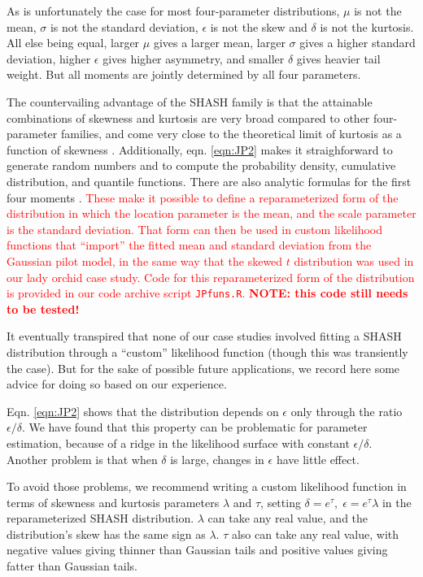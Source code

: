 \documentclass[12pt]{article}
\newcommand{\new}{\textcolor{red}}
\begin{document}
As is unfortunately the case for most four-parameter distributions, $\mu$ is not the mean, $\sigma$ is not the standard deviation, $\epsilon$ is not
the skew and $\delta$ is not the kurtosis. All else being equal, larger $\mu$ gives a larger mean, larger $\sigma$ gives a higher
standard deviation, higher $\epsilon$ gives higher asymmetry, and smaller $\delta$ gives heavier tail weight. 
But all moments are jointly determined by all four parameters. 

The countervailing advantage of the SHASH family is that the attainable combinations of skewness and kurtosis are very broad compared to other 
four-parameter families, and come very close to the theoretical limit of kurtosis as a function of skewness \citep[][Fig.  2]{jones-pewsey-2009}. 
Additionally, eqn. \eqref{eqn:JP2} makes it straighforward to generate random numbers and to compute 
the probability density, cumulative distribution, and quantile functions. There are also analytic formulas for the first four moments
\citep[][p. 764]{jones-pewsey-2009}. \new{These make it possible to define a reparameterized form of the distribution in which the
location parameter is the mean, and the scale parameter is the standard deviation. That form can then be used in
custom likelihood functions that ``import'' the fitted mean and standard deviation from the Gaussian pilot model, 
in the same way that the skewed $t$ distribution was used in our lady orchid case study. 
Code for this reparameterized form of the distribution is provided in our code archive script \texttt{JPfuns.R}. \textbf{NOTE: this code still needs to be tested!}}  

It eventually transpired that none of our case studies involved fitting a SHASH distribution through a ``custom'' likelihood 
function (though this was transiently the case). But for the sake of possible future applications, we record here some 
advice for doing so based on our experience. 

Eqn. \eqref{eqn:JP2} shows that the distribution depends on $\epsilon$ only through the ratio $\epsilon/\delta$. We have found
that this property can be problematic for parameter estimation, because of a ridge in the likelihood surface with constant  
$\epsilon/\delta$. Another problem is that when $\delta$ is large, changes in $\epsilon$ have little effect. 

To avoid those problems, we recommend writing a custom likelihood function in terms of 
skewness and kurtosis parameters $\lambda$ and $\tau$, setting $\delta = e^{\tau}, \; \epsilon =  e^{\tau} \lambda$ in the 
reparameterized SHASH distribution. $\lambda$ can take any real value, and the distribution's skew has the same sign as $\lambda$. 
$\tau$ also can take any real value, with negative values giving thinner than Gaussian tails 
and positive values giving fatter than Gaussian tails. 
\end{document}
